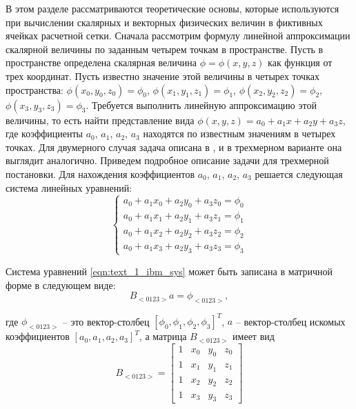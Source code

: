 В этом разделе рассматриваются теоретические основы, которые используются при вычислении скалярных и векторных физических величин в фиктивных ячейках расчетной сетки.
Сначала рассмотрим формулу линейной аппроксимации скалярной величины по заданным четырем точкам в пространстве.
Пусть в пространстве определена скалярная величина $\phi = \phi(x, y, z)$ как функция от трех координат.
Пусть известно значение этой величины в четырех точках пространства: $\phi(x_0, y_0, z_0) = \phi_0$, $\phi(x_1, y_1, z_1) = \phi_1$, $\phi(x_2, y_2, z_2) = \phi_2$, $\phi(x_3, y_3, z_3) = \phi_3$.
Требуется выполнить линейную аппроксимацию этой величины, то есть найти представление вида $\phi(x, y, z) = a_0 + a_1x + a_2y + a_3z$, где коэффициенты $a_0$, $a_1$, $a_2$, $a_3$ находятся по известным значениям в четырех точках.
Для двумерного случая задача описана в \cite{Tseng2003Immersed}, и в трехмерном варианте она выглядит аналогично.
Приведем подробное описание задачи для трехмерной постановки.
Для нахождения коэффициентов $a_0$, $a_1$, $a_2$, $a_3$ решается следующая система линейных уравнений:
\begin{equation}\label{eqn:text_1_ibm_sys}
	\left\{
		\begin{aligned}
			a_0 + a_1x_0 + a_2y_0 + a_3z_0 = \phi_0 \\
			a_0 + a_1x_1 + a_2y_1 + a_3z_1 = \phi_1 \\
			a_0 + a_1x_2 + a_2y_2 + a_3z_2 = \phi_2 \\
			a_0 + a_1x_3 + a_2y_3 + a_3z_3 = \phi_3
		\end{aligned}
	\right.
\end{equation}

Система уравнений \eqref{eqn:text_1_ibm_sys} может быть записана в матричной форме в следующем виде:
\begin{equation}
	B_{<0123>}a = \phi_{<0123>},
\end{equation}

где $\phi_{<0123>}$ -- это вектор-столбец $[\phi_0, \phi_1, \phi_2, \phi_3]^T$, $a$ -- вектор-столбец искомых коэффициентов $[a_0, a_1, a_2, a_3]^T$, а матрица $B_{<0123>}$ имеет вид
\begin{equation}\label{eqn:text_1_ibm_B}
	B_{<0123>} =
	\begin{bmatrix}
		1 & x_0 & y_0 & z_0 \\
		1 & x_1 & y_1 & z_1 \\
		1 & x_2 & y_2 & z_2 \\
		1 & x_3 & y_3 & z_3
	\end{bmatrix}
\end{equation}

